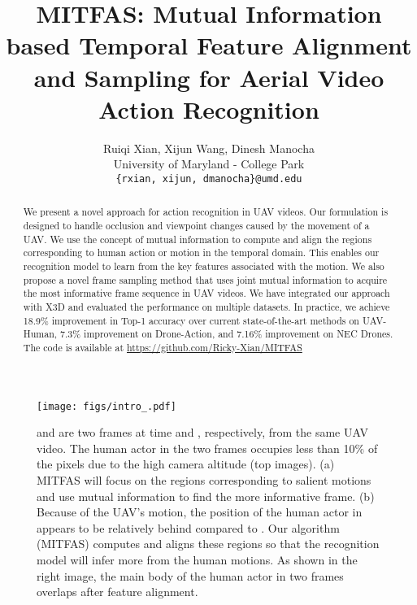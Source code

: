 \documentclass[10pt,twocolumn,letterpaper]{article}
\begin{document}
\title{MITFAS: Mutual Information based Temporal Feature Alignment and Sampling for Aerial Video Action Recognition}

\author{Ruiqi Xian, Xijun Wang, Dinesh Manocha\\
University of Maryland - College Park\\
{\tt\small \{rxian, xijun, dmanocha\}@umd.edu}
}
\maketitle
\def\thefootnote{*}\def\thefootnote{\arabic{footnote}}
\begin{abstract}
We present a novel approach for action recognition in UAV videos. 
Our formulation is designed to handle occlusion and viewpoint changes caused by the movement of a UAV. We use the concept of mutual information to compute and align the regions corresponding to human action or motion in the temporal domain. This enables our recognition model to learn from the key features associated with the motion. We also propose a novel frame sampling method that uses  joint mutual information to acquire the most informative frame sequence 
in UAV videos. We have integrated our approach with X3D and evaluated the performance on multiple datasets. In practice, we achieve 18.9\% improvement in Top-1 accuracy over current state-of-the-art methods on UAV-Human\cite{li2021uav}, 7.3\% improvement on Drone-Action\cite{perera2019drone}, and 7.16\% improvement on NEC Drones\cite{choi2020unsupervised}. The code is available at \href{https://github.com/Ricky-Xian/MITFAS}{https://github.com/Ricky-Xian/MITFAS}
\end{abstract} \begin{figure}[t]
    \centering
    \texttt{[image: figs/intro\_.pdf]}
    \vspace{-6mm}
    \caption{ and  are two frames at time  and , respectively, from the same UAV video. The human actor in the two frames occupies less than 10\% of the pixels due to the high camera altitude (top images). (a) MITFAS will focus on the regions corresponding to salient motions and use mutual information to find the more informative frame. (b) Because of the UAV's motion, the position of the human actor in  appears to be relatively behind compared to . Our algorithm (MITFAS) computes and aligns these regions so that the recognition model will infer more from the human motions. As shown in the right image, the main body of the human actor in two frames overlaps after feature alignment.  
    }
    \label{fig:intro}
    \vspace{-2mm}
\end{figure}
\end{document}
